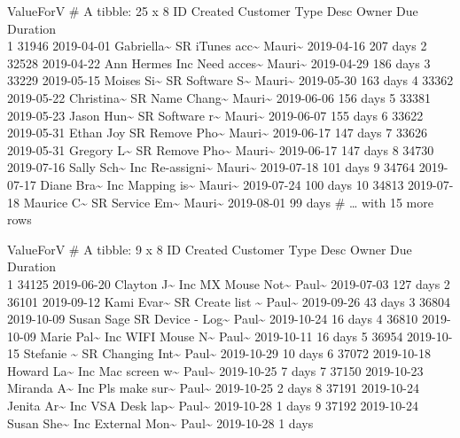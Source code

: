 \documentclass[]{article}
\begin{document}
\pagebreak
ValueForV \# A tibble: 25 x 8 ID Created Customer Type Desc Owner Due
Duration \\
1 31946 2019-04-01 Gabriella\textasciitilde{} SR iTunes
acc\textasciitilde{} Mauri\textasciitilde{} 2019-04-16 207 days 2 32528
2019-04-22 Ann Hermes Inc Need acces\textasciitilde{}
Mauri\textasciitilde{} 2019-04-29 186 days 3 33229 2019-05-15 Moises
Si\textasciitilde{} SR Software S\textasciitilde{}
Mauri\textasciitilde{} 2019-05-30 163 days 4 33362 2019-05-22
Christina\textasciitilde{} SR Name Chang\textasciitilde{}
Mauri\textasciitilde{} 2019-06-06 156 days 5 33381 2019-05-23 Jason
Hun\textasciitilde{} SR Software r\textasciitilde{}
Mauri\textasciitilde{} 2019-06-07 155 days 6 33622 2019-05-31 Ethan Joy
SR Remove Pho\textasciitilde{} Mauri\textasciitilde{} 2019-06-17 147
days 7 33626 2019-05-31 Gregory L\textasciitilde{} SR Remove
Pho\textasciitilde{} Mauri\textasciitilde{} 2019-06-17 147 days 8 34730
2019-07-16 Sally Sch\textasciitilde{} Inc Re-assigni\textasciitilde{}
Mauri\textasciitilde{} 2019-07-18 101 days 9 34764 2019-07-17 Diane
Bra\textasciitilde{} Inc Mapping is\textasciitilde{}
Mauri\textasciitilde{} 2019-07-24 100 days 10 34813 2019-07-18 Maurice
C\textasciitilde{} SR Service Em\textasciitilde{} Mauri\textasciitilde{}
2019-08-01 99 days \# \ldots{} with 15 more rows

\pagebreak
ValueForV \# A tibble: 9 x 8 ID Created Customer Type Desc Owner Due
Duration \\
1 34125 2019-06-20 Clayton J\textasciitilde{} Inc MX Mouse
Not\textasciitilde{} Paul\textasciitilde{} 2019-07-03 127 days 2 36101
2019-09-12 Kami Evar\textasciitilde{} SR Create list \textasciitilde{}
Paul\textasciitilde{} 2019-09-26 43 days 3 36804 2019-10-09 Susan Sage
SR Device - Log\textasciitilde{} Paul\textasciitilde{} 2019-10-24 16
days 4 36810 2019-10-09 Marie Pal\textasciitilde{} Inc WIFI Mouse
N\textasciitilde{} Paul\textasciitilde{} 2019-10-11 16 days 5 36954
2019-10-15 Stefanie \textasciitilde{} SR Changing Int\textasciitilde{}
Paul\textasciitilde{} 2019-10-29 10 days 6 37072 2019-10-18 Howard
La\textasciitilde{} Inc Mac screen w\textasciitilde{}
Paul\textasciitilde{} 2019-10-25 7 days 7 37150 2019-10-23 Miranda
A\textasciitilde{} Inc Pls make sur\textasciitilde{}
Paul\textasciitilde{} 2019-10-25 2 days 8 37191 2019-10-24 Jenita
Ar\textasciitilde{} Inc VSA Desk lap\textasciitilde{}
Paul\textasciitilde{} 2019-10-28 1 days 9 37192 2019-10-24 Susan
She\textasciitilde{} Inc External Mon\textasciitilde{}
Paul\textasciitilde{} 2019-10-28 1 days
\end{document}
